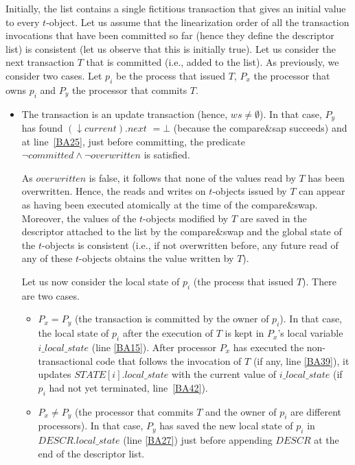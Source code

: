 \begin{proofL}
Initially, the  list  contains a single fictitious  transaction  that gives
an initial value to every  $t$-object. 
Let us assume that the linearization order of all the transaction invocations 
that have been committed  so far (hence they define the descriptor list) is 
consistent  (let us observe that this is initially true). 
Let us consider  the next transaction $T$ that is committed (i.e., added to
the list). 
As previously, we consider two cases.  Let $p_i$ be the process that issued
$T$,  $P_x$ the  processor that  owns $p_i$  and $P_y$  the  processor that
commits $T$.    
%
\begin{itemize}
\item 
The transaction is an update transaction (hence, $ws\neq \emptyset$). 
In that case, $P_y$ has found $(\downarrow current).next$ $=\bot$
(because  the compare\&sap  succeeds) and  at line~\ref{BA25}, just before
committing,  the predicate  $\neg committed \wedge \neg overwritten$ 
is satisfied.  

As  $overwritten$ is false, it follows that none of the values read by $T$ 
has been overwritten. Hence,  the reads and writes on 
$t$-objects issued by $T$ can appear as having been executed atomically at 
the time of the compare\&swap. Moreover,  the values of the $t$-objects 
modified by $T$  are saved in the  descriptor attached to the list
by the compare\&swap and the global state of the $t$-objects is 
consistent (i.e., if not overwritten  before, any future read of any of these 
$t$-objects obtains the value  written by $T$). 

Let us now consider the local state of $p_i$ (the process that issued $T$). 
There are  two cases. 
\begin{itemize}
\item $P_x=P_y$ (the transaction is committed by the owner of $p_i$). 
In that case, the local state of $p_i$ after the execution of $T$ 
is kept in $P_x$'s local variable $i\_local\_state$ (line \ref{BA15}). 
After processor $P_x$ has executed the 
non-transactional code that follows the invocation of $T$ (if any, line
\ref{BA39}), it  updates $\mathit{STATE}[i].local\_state$ with 
the current value of  $i\_local\_state$ (if $p_i$ had not yet terminated,
line~\ref{BA42}). 
%
\item $P_x \neq P_y$ (the processor that commits $T$ and the owner of $p_i$ 
are different processors). 
In that case, $P_y$ has saved the new local state of $p_i$ in 
$\mathit{DESCR}.local\_state$ (line \ref{BA27}) just before 
appending $\mathit{DESCR}$ at the end of the descriptor list. 


\end{itemize}
\end{itemize}
\end{proofL}
